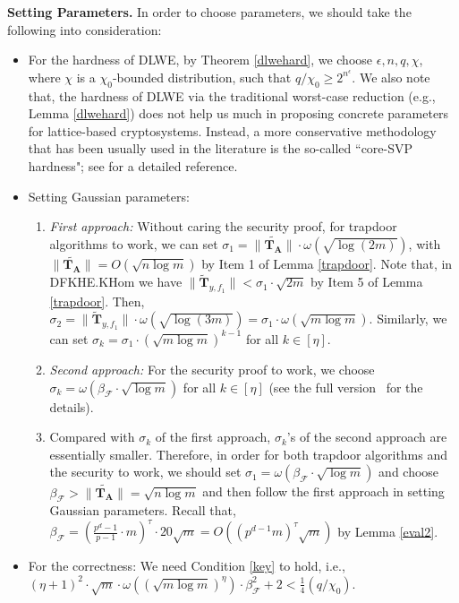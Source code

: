 \documentclass[runningheads,10pt]{llncs}
\begin{document}
\noindent \textbf{Setting Parameters.} In order to choose parameters, we should take the following into consideration:
	\begin{itemize}
		\item For the hardness of DLWE, by Theorem \ref{dlwehard}, we choose $\epsilon, n, q, \chi$, where  $\chi$ is a $\chi_0$-bounded distribution, such that $q/\chi_0\geq 2^{n^\epsilon}$. We also note that, the hardness of DLWE via the traditional worst-case reduction (e.g., Lemma \ref{dlwehard}) does not help  us much in proposing concrete parameters for lattice-based cryptosystems. Instead, a more conservative methodology that has been usually used in
the literature is the so-called ``core-SVP hardness"; see \cite[Subsection 5.2.1]{ABD+20}  for a detailed reference.
		\item Setting Gaussian parameters:
			\begin{enumerate}
		\item \textit{First approach:} Without caring the security proof, for trapdoor algorithms  to work, we can set $\sigma_1=\| \widetilde{\textbf{T}_{\textbf{A}}}\|\cdot\omega(\sqrt{\log (2m)})$, with $\| \widetilde{\textbf{T}_{\textbf{A}}}\|=O(\sqrt{n\log m})$ by Item 1 of Lemma \ref{trapdoor}. Note that, in \textsf{DFKHE.KHom} we have $\| \widetilde{\textbf{T}}_{y,f_1}\| <\sigma_1 \cdot \sqrt{2m}$  by Item 5 of Lemma \ref{trapdoor}. Then, $\sigma_2=\| \widetilde{\textbf{T}}_{y,f_1}\| \cdot \omega(\sqrt{\log (3m)})=\sigma_1 \cdot \omega(\sqrt{m\log m}).$ Similarly, we can set $\sigma_k=\sigma_1\cdot(\sqrt{m\log m})^{k-1}$ for all $k \in [\eta]$.
\item \textit{Second approach:} For  the security proof to work, we choose $\sigma_k=\omega(\beta_\mathcal{F}\cdot \sqrt{\log m})$ for all $k \in [\eta]$ (see the full version~\cite{fullversion} for the details).
\item Compared with $\sigma_k$ of the first approach, $\sigma_k$'s of the second approach are essentially smaller. Therefore, in order for both trapdoor algorithms and the security to work, we should set $\sigma_1=\omega(\beta_\mathcal{F}\cdot \sqrt{\log m})$ and choose $\beta_{\mathcal{F}} >\| \widetilde{\textbf{T}_{\textbf{A}}}\|=\sqrt{n\log m}$ and then follow the first approach in setting Gaussian parameters.  Recall that, $\beta_{\mathcal{F}}=(\frac{p^d-1}{p-1}\cdot m)^\tau \cdot 20\sqrt{m}=O((p^{d-1}m)^\tau\sqrt{m})$ by Lemma \ref{eval2}.
	\end{enumerate}
\item For the correctness: We need Condition \eqref{key} to hold, i.e., $		(\eta+1)^2\cdot \sqrt{m}\cdot \omega( (\sqrt{m\log m})^{\eta})\cdot \beta_{\mathcal{F}}^2+2<\frac{1}{4}(q/\chi_0)$.
\end{itemize}
\end{document}

